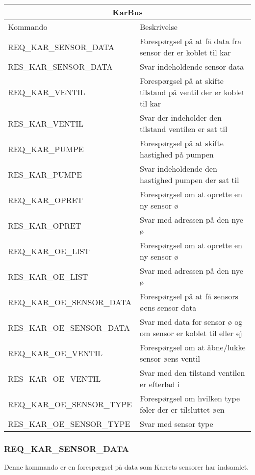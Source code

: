 \begin{table}[H]
\setlength{\parindent}{12pt}
\begin{tabular}{|l|l|}\hline
\multicolumn{2}{|c|}{KarBus\cellcolor[gray]{0.7}}\\\hline
Kommando & Beskrivelse \\\hline
REQ\_KAR\_SENSOR\_DATA 		& Forespørgsel på at få data fra sensor der er koblet til kar \\\hline 
RES\_KAR\_SENSOR\_DATA 		& Svar indeholdende sensor data								 \\\hline 
REQ\_KAR\_VENTIL	   		& Forespørgsel på at skifte tilstand på ventil der er koblet til kar \\\hline 
RES\_KAR\_VENTIL       		& Svar der indeholder den tilstand ventilen er sat til \\\hline 
REQ\_KAR\_PUMPE		   		& Forespørgsel på at skifte hastighed på pumpen \\\hline 
RES\_KAR\_PUMPE 	   		& Svar indeholdende den hastighed pumpen der sat til \\\hline 
REQ\_KAR\_OPRET 	   		& Forespørgsel om at oprette en ny sensor ø \\\hline
RES\_KAR\_OPRET 	   		& Svar med adressen på den nye ø \\\hline 
REQ\_KAR\_OE\_LIST	   		& Forespørgsel om at oprette en ny sensor ø \\\hline
RES\_KAR\_OE\_LIST	   		& Svar med adressen på den nye ø \\\hline 
REQ\_KAR\_OE\_SENSOR\_DATA	& Forespørgsel på at få sensors øens sensor data \\\hline
RES\_KAR\_OE\_SENSOR\_DATA 	& Svar med data for sensor ø og om sensor er koblet til eller ej \\\hline 
REQ\_KAR\_OE\_VENTIL 	    & Forespørgsel om at åbne/lukke sensor øens ventil \\\hline
RES\_KAR\_OE\_VENTIL 	    & Svar med den tilstand ventilen er efterlad i \\\hline
REQ\_KAR\_OE\_SENSOR\_TYPE 	& Forespørgsel om hvilken type føler der er tilsluttet øen \\\hline
RES\_KAR\_OE\_SENSOR\_TYPE 	& Svar med sensor type \\\hline  
\end{tabular}
\end{table}

\subsubsection{REQ\_KAR\_SENSOR\_DATA}
Denne kommando er en forespørgsel på data som Karrets sensorer har indsamlet.

